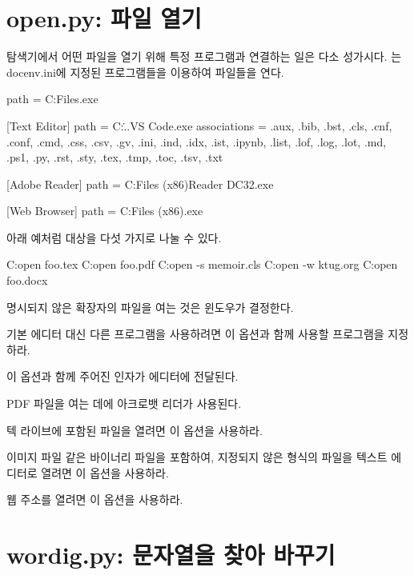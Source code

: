 \coderead[file=tlconf.cmd, language=bat, fontsize=\footnotesize]

\section{open.py: 파일 열기}

탐색기에서 어떤 파일을 열기 위해 특정 프로그램과 연결하는 일은 다소 성가시다.
는 docenv.ini에 지정된 프로그램들을 이용하여 파일들을 연다.

\begin{codewrite}
[SumatraPDF]
path = C:\Program Files\SumatraPDF\SumatraPDF.exe

[Text Editor]
path = C:\...\Microsoft VS Code\code.exe
associations = .aux, .bib, .bst, .cls, .cnf, .conf, .cmd, .css, .csv, .gv,
 .ini, .ind, .idx, .ist, .ipynb, .list, .lof, .log, .lot, .md, .ps1, .py, 
 .rst, .sty, .tex, .tmp, .toc, .tsv, .txt

[Adobe Reader]
path = C:\Program Files (x86)\Adobe\Acrobat Reader DC\Reader\AcroRd32.exe

[Web Browser]
path = C:\Program Files (x86)\Google\Chrome\Application\chrome.exe
\end{codewrite}
\coderead[language=ini] 

아래 예처럼 대상을 다섯 가지로 나눌 수 있다.

\begin{code}
C:\>open foo.tex
C:\>open foo.pdf
C:\>open -s memoir.cls 
C:\>open -w ktug.org
C:\>open foo.docx
\end{code}

명시되지 않은 확장자의 파일을 여는 것은 윈도우가 결정한다.

\begin{macros}
\item[-a] 기본 에디터 대신 다른 프로그램을 사용하려면 이 옵션과 함께 사용할 프로그램을 지정하라.
\item[-o] 이 옵션과 함께 주어진 인자가 에디터에 전달된다.
\item[-A] PDF 파일을 여는 데에 아크로뱃 리더가 사용된다.
\item[-s] 텍 라이브에 포함된 파일을 열려면 이 옵션을 사용하라.
\item[-f] 이미지 파일 같은 바이너리 파일을 포함하여, 지정되지 않은 형식의 파일을 텍스트 에디터로 열려면 이 옵션을 사용하라.
\item[-w] 웹 주소를 열려면 이 옵션을 사용하라.
\end{macros}

\section{wordig.py: 문자열을 찾아 바꾸기}

